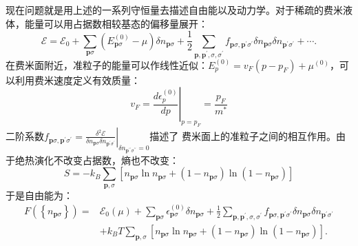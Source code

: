 \documentclass[10pt,openany]{book}
\theoremstyle{thmstyle} %
\theoremstyle{defstyle} %
\theoremstyle{prostyle} %
\begin{document}
现在问题就是用上述的一系列守恒量去描述自由能以及动力学。对于稀疏的费米液体，能量可以用占据数相较基态的偏移量展开：
\begin{equation}
	\mathcal{E}=\mathcal{E}_0+\sum_{\mathbf{p} \sigma}\left(E_{\mathbf{p} \sigma}^{(0)}-\mu\right) \delta n_{\mathbf{p} \sigma}+\frac{1}{2} \sum_{\mathbf{p}, \mathbf{p}^{\prime}, \sigma, \sigma^{\prime}} f_{\mathbf{p} \sigma, \mathbf{p}^{\prime} \sigma^{\prime}} \delta n_{\mathbf{p} \sigma} \delta n_{\mathbf{p}^{\prime} \sigma^{\prime}}+\cdots .
\end{equation}
在费米面附近，准粒子的能量可以作线性近似：$ E_p^{(0)}=v_F\left(p-p_F\right)+\mu^{(0)} $，可以利用费米速度定义有效质量：
\begin{equation}
	v_F=\left.\frac{d \epsilon_p^{(0)}}{d p}\right|_{p=p_F}=\frac{p_F}{m^*}
\end{equation}
二阶系数$ f_{\mathbf{p} \sigma, \mathbf{p}^{\prime} \sigma^{\prime}}=\left.\frac{\delta^2 \mathcal{E}}{\delta n_{\mathbf{p} \sigma} \delta n_{\mathbf{p}^{\prime} \sigma^{\prime}}}\right|_{\delta n_{\mathbf{p}^{\prime \prime} \sigma^{\prime \prime}}=0} $描述了
费米面上的准粒子之间的相互作用。由于绝热演化不改变占据数，熵也不改变：
\begin{equation}
	S=-k_B \sum_{\mathbf{p}, \sigma}\left[n_{\mathbf{p} \sigma} \ln n_{\mathbf{p} \sigma}+\left(1-n_{\mathbf{p} \sigma}\right) \ln \left(1-n_{\mathbf{p} \sigma}\right)\right]
\end{equation}
于是自由能为：
\begin{equation}
	\begin{aligned}
		F\left(\left\{n_{\mathbf{p} \sigma}\right\}\right)= & \mathcal{E}_0(\mu)+\sum_{\mathbf{p} \sigma} \epsilon_{\mathbf{p} \sigma}^{(0)} \delta n_{\mathbf{p} \sigma}+\frac{1}{2} \sum_{\mathbf{p}, \mathbf{p}^{\prime}, \sigma, \sigma^{\prime}} f_{\mathbf{p} \sigma, \mathbf{p}^{\prime} \sigma^{\prime}} \delta n_{\mathbf{p} \sigma} \delta n_{\mathbf{p}^{\prime} \sigma^{\prime}} \\
		& +k_B T \sum_{\mathbf{p}, \sigma}\left[n_{\mathbf{p} \sigma} \ln n_{\mathbf{p} \sigma}+\left(1-n_{\mathbf{p} \sigma}\right) \ln \left(1-n_{\mathbf{p} \sigma}\right)\right] .
		\end{aligned}
		\label{HFE}
\end{equation}
\end{document}
